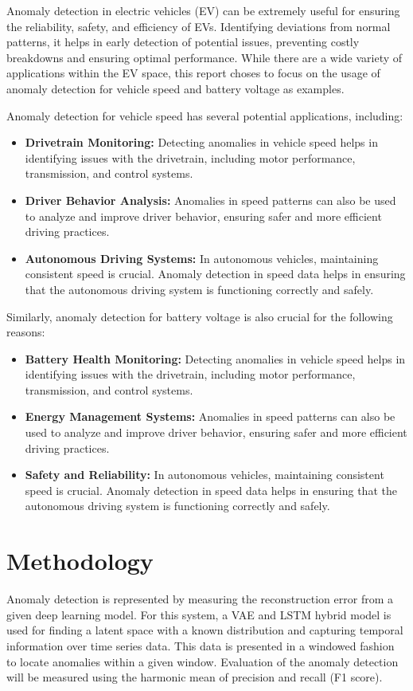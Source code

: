 \documentclass[conference]{IEEEtran}
\begin{document}
Anomaly detection in electric vehicles (EV) can be extremely useful for ensuring the reliability, safety, and efficiency of EVs. Identifying deviations from normal patterns, it helps in early detection of potential issues, preventing costly breakdowns and ensuring optimal performance. While there are a wide variety of applications within the EV space, this report choses to focus on the usage of anomaly detection for vehicle speed and battery voltage as examples.

Anomaly detection for vehicle speed has several potential applications, including:

\begin{itemize}
    \item \textbf{Drivetrain Monitoring:} Detecting anomalies in vehicle speed helps in identifying issues with the drivetrain, including motor performance, transmission, and control systems.
    \item \textbf{Driver Behavior Analysis:} Anomalies in speed patterns can also be used to analyze and improve driver behavior, ensuring safer and more efficient driving practices.
    \item \textbf{Autonomous Driving Systems:} In autonomous vehicles, maintaining consistent speed is crucial. Anomaly detection in speed data helps in ensuring that the autonomous driving system is functioning correctly and safely.
\end{itemize}

Similarly, anomaly detection for battery voltage is also crucial for the following reasons:
\begin{itemize}
    \item \textbf{Battery Health Monitoring:} Detecting anomalies in vehicle speed helps in identifying issues with the drivetrain, including motor performance, transmission, and control systems.
    \item \textbf{Energy Management Systems:} Anomalies in speed patterns can also be used to analyze and improve driver behavior, ensuring safer and more efficient driving practices.
    \item \textbf{Safety and Reliability:} In autonomous vehicles, maintaining consistent speed is crucial. Anomaly detection in speed data helps in ensuring that the autonomous driving system is functioning correctly and safely.
\end{itemize}

\section{Methodology}
Anomaly detection is represented by measuring the reconstruction error from a given deep learning model. For this system, a VAE and LSTM hybrid model is used for finding a latent space with a known distribution and capturing temporal information over time series data. This data is presented in a windowed fashion to locate anomalies within a given window. Evaluation of the anomaly detection will be measured using the harmonic mean of precision and recall (F1 score).
\end{document}
